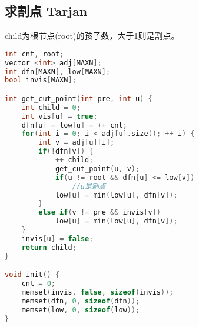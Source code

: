 \subsection{求割点 Tarjan}
child为根节点(root)的孩子数，大于1则是割点。
    \begin{lstlisting}[language=c++]
int cnt, root;
vector <int> adj[MAXN];
int dfn[MAXN], low[MAXN];
bool invis[MAXN];

int get_cut_point(int pre, int u) {
    int child = 0;
    int vis[u] = true;
    dfn[u] = low[u] = ++ cnt;
    for(int i = 0; i < adj[u].size(); ++ i) {
        int v = adj[u][i];
        if(!dfn[v]) {
            ++ child;
            get_cut_point(u, v);
            if(u != root && dfn[u] <= low[v])
                //u是割点
            low[u] = min(low[u], dfn[v]);
        }
        else if(v != pre && invis[v])
            low[u] = min(low[u], dfn[v]);
    }
    invis[u] = false;
    return child;
}

void init() {
    cnt = 0;
    memset(invis, false, sizeof(invis));
    memset(dfn, 0, sizeof(dfn));
    memset(low, 0, sizeof(low));
}
    \end{lstlisting}
